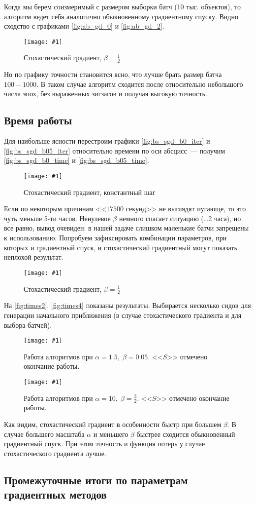 \documentclass[12pt]{article}
\newcommand{\mpl}[2]{
    \begin{figure}[!h]
        \texttt{[image: \#1]}
        \centering
        \caption{#2}
        \label{fig:#1}
     \end{figure}
}
\begin{document}
Когда мы берем соизмеримый с размером выборки батч (10 тыс. объектов), то алгоритм ведет себя аналогично обыкновенному градиентному спуску. Видно сходство с графиками \autoref{fig:ab_gd_0} и \autoref{fig:ab_gd_2}.

\mpl{bs_sgd_b05_iter}{Стохастический градиент, $\beta=\frac{1}{2}$}

Но по графику точности становится ясно, что лучше брать размер батча $100-1000$. В таком случае алгоритм сходится после относительно небольшого числа эпох, без выраженных зигзагов и получая высокую точность.

\subsection{Время работы}

Для наибольше ясности перестроим графики \autoref{fig:bs_sgd_b0_iter} и \autoref{fig:bs_sgd_b05_iter} относительно времени по оси абсцисс~--- получим \autoref{fig:bs_sgd_b0_time} и \autoref{fig:bs_sgd_b05_time}.

\mpl{bs_sgd_b0_time}{Стохастический градиент, константный шаг}

Если по некоторым причинам <<$17500$ секунд>> не выглядят пугающе, то это чуть меньше 5-ти часов. Ненулевое $\beta$ немного спасает ситуацию (\dots2 часа), но все равно, вывод очевиден: в нашей задаче слишком маленькие батчи запрещены к использованию. Попробуем зафиксировать комбинации параметров, при которых и градиентный спуск, и стохастический градиентный могут показать неплохой результат. 

\mpl{bs_sgd_b05_time}{Стохастический градиент, $\beta=\frac{1}{2}$}

На \autoref{fig:times2},  \autoref{fig:times4} показаны результаты. Выбирается несколько сидов для генерации начального приближения (в случае стохастического градиента и для выбора батчей).
\mpl{times2}{Работа алгоритмов при $\alpha=1.5,\; \beta=0.05$. <<$S$>> отмечено окончание работы.}
\mpl{times4}{Работа алгоритмов при $\alpha=10,\;\beta=\frac{3}{2}$. <<$S$>> отмечено окончание работы.}
Как видим, стохастический градиент в особенности быстр при большем $\beta$. В случае большего масштаба $\alpha$ и меньшего $\beta$ быстрее сходится обыкновенный градиентный спуск. При этом точность и функция потерь у случае стохастического градиента лучше.

\subsection{Промежуточные итоги по параметрам градиентных методов}
\end{document}
